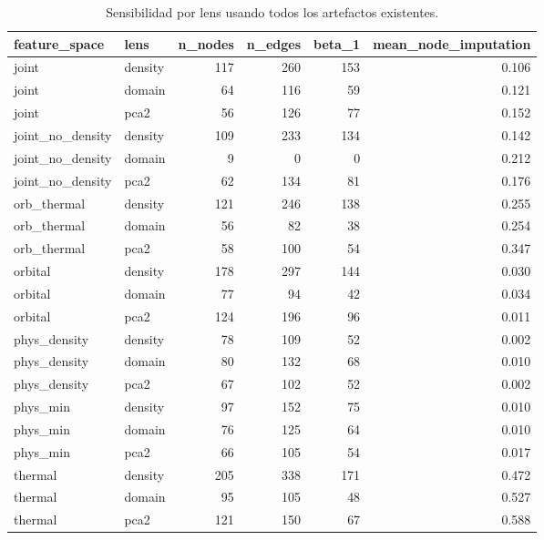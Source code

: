 \begin{table}[H]
\centering
\scriptsize
\caption{Sensibilidad por lens usando todos los artefactos existentes.}
\label{tab:lens_sensitivity}
\begin{adjustbox}{max width=\linewidth}
\begin{tabular}{llrrrr}
\toprule
feature\_space & lens & n\_nodes & n\_edges & beta\_1 & mean\_node\_imputation \\
\midrule
joint & density & 117 & 260 & 153 & 0.106 \\
joint & domain & 64 & 116 & 59 & 0.121 \\
joint & pca2 & 56 & 126 & 77 & 0.152 \\
joint\_no\_density & density & 109 & 233 & 134 & 0.142 \\
joint\_no\_density & domain & 9 & 0 & 0 & 0.212 \\
joint\_no\_density & pca2 & 62 & 134 & 81 & 0.176 \\
orb\_thermal & density & 121 & 246 & 138 & 0.255 \\
orb\_thermal & domain & 56 & 82 & 38 & 0.254 \\
orb\_thermal & pca2 & 58 & 100 & 54 & 0.347 \\
orbital & density & 178 & 297 & 144 & 0.030 \\
orbital & domain & 77 & 94 & 42 & 0.034 \\
orbital & pca2 & 124 & 196 & 96 & 0.011 \\
phys\_density & density & 78 & 109 & 52 & 0.002 \\
phys\_density & domain & 80 & 132 & 68 & 0.010 \\
phys\_density & pca2 & 67 & 102 & 52 & 0.002 \\
phys\_min & density & 97 & 152 & 75 & 0.010 \\
phys\_min & domain & 76 & 125 & 64 & 0.010 \\
phys\_min & pca2 & 66 & 105 & 54 & 0.017 \\
thermal & density & 205 & 338 & 171 & 0.472 \\
thermal & domain & 95 & 105 & 48 & 0.527 \\
thermal & pca2 & 121 & 150 & 67 & 0.588 \\
\bottomrule
\end{tabular}
\end{adjustbox}

\end{table}
